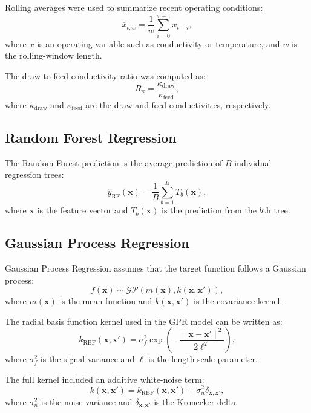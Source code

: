 Rolling averages were used to summarize recent operating conditions:
\begin{equation}
\overline{x}_{t,w} = \frac{1}{w}\sum_{i=0}^{w-1} x_{t-i},
\end{equation}
where $x$ is an operating variable such as conductivity or temperature, and $w$ is the rolling-window length.

The draw-to-feed conductivity ratio was computed as:
\begin{equation}
R_{\kappa} = \frac{\kappa_{\mathrm{draw}}}{\kappa_{\mathrm{feed}}},
\end{equation}
where $\kappa_{\mathrm{draw}}$ and $\kappa_{\mathrm{feed}}$ are the draw and feed conductivities, respectively.

\subsection{Random Forest Regression}
The Random Forest prediction is the average prediction of $B$ individual regression trees:
\begin{equation}
\hat{y}_{\mathrm{RF}}(\mathbf{x}) =
\frac{1}{B}\sum_{b=1}^{B} T_b(\mathbf{x}),
\end{equation}
where $\mathbf{x}$ is the feature vector and $T_b(\mathbf{x})$ is the prediction from the $b$th tree.

\subsection{Gaussian Process Regression}
Gaussian Process Regression assumes that the target function follows a Gaussian process:
\begin{equation}
f(\mathbf{x}) \sim \mathcal{GP}\left(m(\mathbf{x}), k(\mathbf{x},\mathbf{x}')\right),
\end{equation}
where $m(\mathbf{x})$ is the mean function and $k(\mathbf{x},\mathbf{x}')$ is the covariance kernel.

The radial basis function kernel used in the GPR model can be written as:
\begin{equation}
k_{\mathrm{RBF}}(\mathbf{x},\mathbf{x}') =
\sigma_f^2 \exp\left(
-\frac{\|\mathbf{x}-\mathbf{x}'\|^2}{2\ell^2}
\right),
\end{equation}
where $\sigma_f^2$ is the signal variance and $\ell$ is the length-scale parameter.

The full kernel included an additive white-noise term:
\begin{equation}
k(\mathbf{x},\mathbf{x}') =
k_{\mathrm{RBF}}(\mathbf{x},\mathbf{x}') +
\sigma_n^2\delta_{\mathbf{x},\mathbf{x}'},
\end{equation}
where $\sigma_n^2$ is the noise variance and $\delta_{\mathbf{x},\mathbf{x}'}$ is the Kronecker delta.

